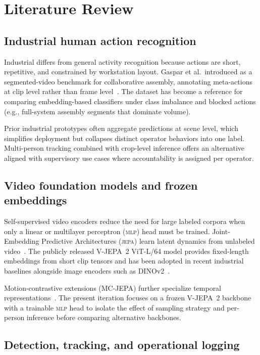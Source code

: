\section{Literature Review}
\label{sec:literature}

\subsection{Industrial human action recognition}

Industrial \har{} differs from general activity recognition because actions are short, repetitive, and constrained by workstation layout.
Gaspar et al.\ introduced \inhard{} as a segmented-video benchmark for collaborative assembly, annotating meta-actions at clip level rather than frame level~\cite{gaspar2020inhard}.
The dataset has become a reference for comparing embedding-based classifiers under class imbalance and blocked actions (e.g., full-system assembly segments that dominate volume).

Prior industrial prototypes often aggregate predictions at scene level, which simplifies deployment but collapses distinct operator behaviors into one label.
Multi-person tracking combined with crop-level inference offers an alternative aligned with supervisory use cases where accountability is assigned per operator.

\subsection{Video foundation models and frozen embeddings}

Self-supervised video encoders reduce the need for large labeled corpora when only a linear or multilayer perceptron (\textsc{mlp}) head must be trained.
Joint-Embedding Predictive Architectures (\textsc{jepa}) learn latent dynamics from unlabeled video~\cite{assran2025vjepa2}.
The publicly released V-JEPA~2 ViT-L/64 model provides fixed-length embeddings from short clip tensors and has been adopted in recent industrial \har{} baselines alongside image encoders such as DINOv2~\cite{ochs2023dinov2}.

Motion-contrastive extensions (MC-JEPA) further specialize temporal representations~\cite{wang2023mcjepa}.
The present iteration focuses on a frozen V-JEPA~2 backbone with a trainable \textsc{mlp} head to isolate the effect of sampling strategy and per-person inference before comparing alternative backbones.

\subsection{Detection, tracking, and operational logging}

